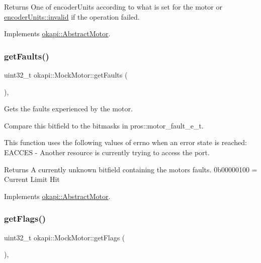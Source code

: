 \begin{DoxyReturn}{Returns}
One of encoder\+Units according to what is set for the motor or \mbox{\hyperlink{classokapi_1_1AbstractMotor_ae811cd825099f2defadeb1b7f7e7764cafedb2d84cafe20862cb4399751a8a7e3}{encoder\+Units\+::invalid}} if the operation failed. 
\end{DoxyReturn}


Implements \mbox{\hyperlink{classokapi_1_1AbstractMotor_ae8225381a81ca0b54469949a6022b775}{okapi\+::\+Abstract\+Motor}}.

\mbox{\label{classokapi_1_1MockMotor_a8381cd06b1cc9489d21a9e5bd4ed9e99}} 
\subsubsection{\texorpdfstring{getFaults()}{getFaults()}}
{\footnotesize\ttfamily uint32\+\_\+t okapi\+::\+Mock\+Motor\+::get\+Faults (\begin{DoxyParamCaption}{ }\end{DoxyParamCaption})\hspace{0.3cm}{\ttfamily [override]}, {\ttfamily [virtual]}}



Gets the faults experienced by the motor. 

Compare this bitfield to the bitmasks in pros\+::motor\+\_\+fault\+\_\+e\+\_\+t.

This function uses the following values of errno when an error state is reached\+: E\+A\+C\+C\+ES -\/ Another resource is currently trying to access the port.

\begin{DoxyReturn}{Returns}
A currently unknown bitfield containing the motor\textquotesingle{}s faults. 0b00000100 = Current Limit Hit 
\end{DoxyReturn}


Implements \mbox{\hyperlink{classokapi_1_1AbstractMotor_ae741463ec8de88c4f7ba854b5d6d7bce}{okapi\+::\+Abstract\+Motor}}.

\mbox{\label{classokapi_1_1MockMotor_ad3c5f7b39feb1744216adb7118721369}} 
\subsubsection{\texorpdfstring{getFlags()}{getFlags()}}
{\footnotesize\ttfamily uint32\+\_\+t okapi\+::\+Mock\+Motor\+::get\+Flags (\begin{DoxyParamCaption}{ }\end{DoxyParamCaption})\hspace{0.3cm}{\ttfamily [override]}, {\ttfamily [virtual]}}




